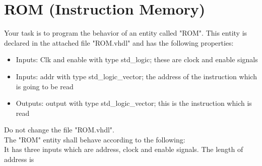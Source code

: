 \documentclass[a4paper,12pt]{article}
\begin{document}
\pagestyle{empty}
\setlength{\parindent}{0em} 
\section*{ROM (Instruction Memory)}


Your task is to program the behavior of an entity called "ROM". This entity is declared in the attached file "ROM.vhdl" and has the following properties:
\begin{itemize}
\item Inputs: Clk and enable with type std\_logic; these are clock and enable signals
\item Inputs: addr with type std\_logic\_vector; the address of the instruction which is going to be read
\item Outputs: output with type std\_logic\_vector; this is the instruction which is read 
\end{itemize}
\vspace{0.3cm}
\begin{center}
\end{center}

Do not change the file "ROM.vhdl".\\

The "ROM" entity shall behave according to the following:\\

It has three inputs which are address, clock and enable signals. The length of address is %
\end{document}
